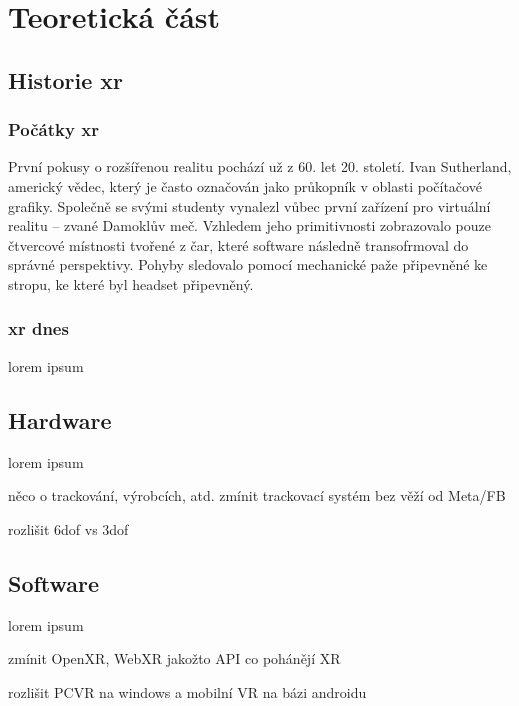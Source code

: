 \part{Teoretická část}

\chapter{Historie \gls{xr}}

\section{Počátky \gls{xr}}

První pokusy o rozšířenou realitu pochází už z 60. let 20. století. Ivan Sutherland, americký vědec, který je často označován jako průkopník v oblasti počítačové grafiky. Společně se svými studenty vynalezl vůbec první zařízení pro virtuální realitu -- zvané Damoklův meč. Vzhledem jeho primitivnosti zobrazovalo pouze čtvercové místnosti tvořené z čar, které software následně transofrmoval do správné perspektivy. Pohyby sledovalo pomocí mechanické paže připevněné ke stropu, ke které byl headset připevněný.

\section{\gls{xr} dnes}

lorem ipsum

\chapter{Hardware}
lorem ipsum

něco o trackování, výrobcích, atd. zmínit trackovací systém bez věží od Meta/FB

rozlišit 6dof vs 3dof

\chapter{Software}
lorem ipsum

zmínit OpenXR, WebXR jakožto API co pohánějí XR

rozlišit PCVR na windows a mobilní VR na bázi androidu